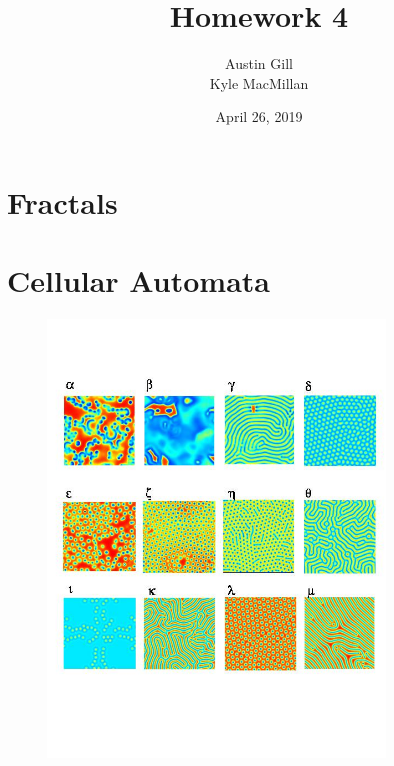 \documentclass[12pt]{article}
\title{Homework 4}
\author{Austin Gill \\ Kyle MacMillan}
\date{April 26, 2019}
\begin{document}
\maketitle
\begingroup
\hypersetup{linkcolor=black}
\tableofcontents
\listoftodos
\endgroup
\newpage

\part{Fractals}




\part{Cellular Automata}
\begin{figure}[H]
    \centering
    \includegraphics[width=0.8\textwidth]{figures/reactions/patterns.jpg}
\end{figure}


\end{document}
